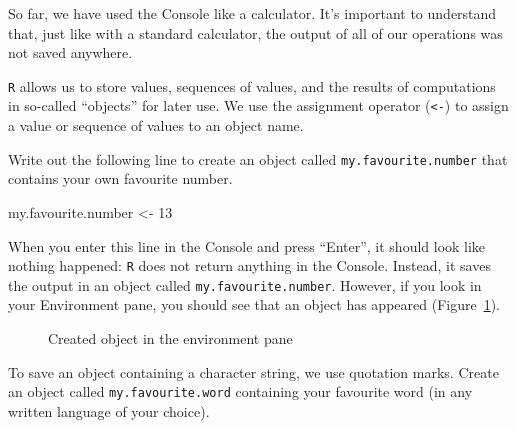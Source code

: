 \documentclass[
  letterpaper,
  DIV=11,
  numbers=noendperiod,
  oneside]{scrreprt}
\newenvironment{Shaded}{\begin{snugshade}}{\end{snugshade}}
\newcommand{\DecValTok}[1]{\textcolor[rgb]{0.68,0.00,0.00}{#1}}
\newcommand{\NormalTok}[1]{\textcolor[rgb]{0.00,0.23,0.31}{#1}}
\newcommand{\OtherTok}[1]{\textcolor[rgb]{0.00,0.23,0.31}{#1}}
\begin{document}
So far, we have used the Console like a calculator. It's important to
understand that, just like with a standard calculator, the output of all
of our operations was not saved anywhere.

\texttt{R} allows us to store values, sequences of values, and the
results of computations in so-called ``objects'' for later use. We use
the assignment operator (\texttt{\textless{}-}) to assign a value or
sequence of values to an object name.

Write out the following line to create an object called
\texttt{my.favourite.number} that contains your own favourite number.

\begin{Shaded}
\begin{Highlighting}[]
\NormalTok{my.favourite.number }\OtherTok{\textless{}{-}} \DecValTok{13}
\end{Highlighting}
\end{Shaded}

When you enter this line in the Console and press ``Enter'', it should
look like nothing happened: \texttt{R} does not return anything in the
Console. Instead, it saves the output in an object called
\texttt{my.favourite.number}. However, if you look in your Environment
pane, you should see that an object has appeared
(Figure~\ref{fig-ObjectCreation}).

\begin{figure}


\caption{\label{fig-ObjectCreation}Created object in the environment
pane}

\end{figure}%

To save an object containing a character string, we use quotation marks.
Create an object called \texttt{my.favourite.word} containing your
favourite word (in any written language of your choice).
\end{document}
